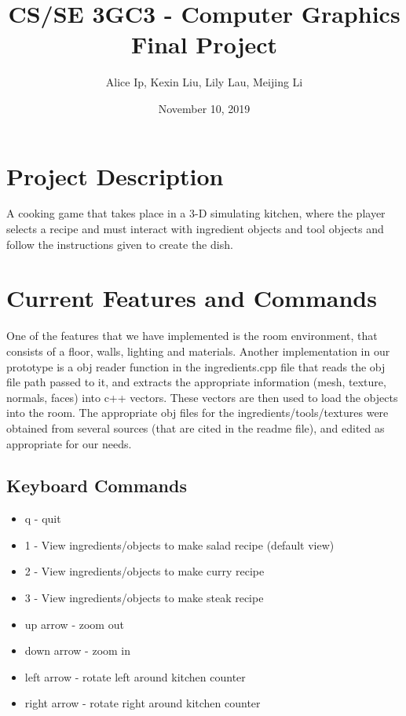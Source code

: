 \documentclass[11pt]{article}
\author{Alice Ip, Kexin Liu, Lily Lau, Meijing Li}
\date{November 10, 2019}
\title{CS/SE 3GC3 - Computer Graphics Final Project}
\begin{document}
\maketitle

\section*{Project Description}
\label{sec:org20b9486}
A cooking game that takes place in a 3-D simulating kitchen, where the player selects a recipe and must interact with ingredient objects and tool objects and follow the instructions given to create the dish.

\section*{Current Features and Commands}
\label{sec:org2a7d9f6}
One of the features that we have implemented is the room environment, that consists of a floor, walls, lighting and materials. Another implementation in our prototype is a obj reader function in the ingredients.cpp file that reads the obj file path passed to it, and extracts the appropriate information (mesh, texture, normals, faces) into c++ vectors. These vectors are then used to load the objects into the room. The appropriate obj files for the ingredients/tools/textures were obtained from several sources (that are cited in the readme file), and edited as appropriate for our needs. 

\subsection*{Keyboard Commands}
\label{sec:org1222e5e}
\begin{itemize}
\item q - quit
\item 1 - View ingredients/objects to make salad recipe (default view)
\item 2 - View ingredients/objects to make curry recipe
\item 3 - View ingredients/objects to make steak recipe
\item up arrow - zoom out
\item down arrow - zoom in
\item left arrow - rotate left around kitchen counter
\item right arrow - rotate right around kitchen counter
\end{itemize}
\end{document}

